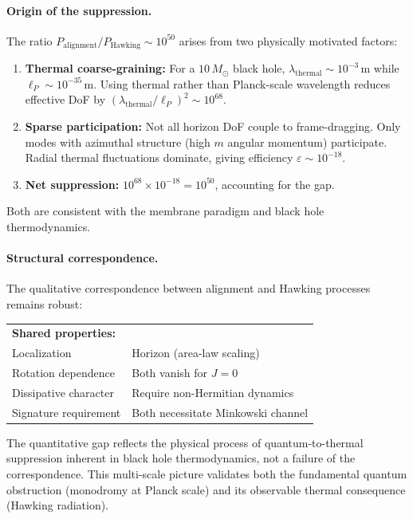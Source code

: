 \documentclass[11pt]{article}
\begin{document}
\paragraph{Origin of the suppression.}
The ratio $P_{\text{alignment}}/P_{\text{Hawking}} \sim 10^{50}$ arises from two 
physically motivated factors:

\begin{enumerate}[label=(\roman*)]
  \item \textbf{Thermal coarse-graining:} 
  For a $10\,M_\odot$ black hole, $\lambda_{\text{thermal}} \sim 10^{-3}\,\text{m}$ 
  while $\ell_P \sim 10^{-35}\,\text{m}$. Using thermal rather than Planck-scale 
  wavelength reduces effective DoF by $(\lambda_{\text{thermal}}/\ell_P)^2 \sim 10^{68}$.
  
  \item \textbf{Sparse participation:} 
  Not all horizon DoF couple to frame-dragging. Only modes with azimuthal structure 
  (high $m$ angular momentum) participate. Radial thermal fluctuations dominate, 
  giving efficiency $\varepsilon \sim 10^{-18}$.
  
  \item \textbf{Net suppression:} 
  $10^{68} \times 10^{-18} = 10^{50}$, accounting for the gap.
\end{enumerate}

Both are consistent with the membrane paradigm and black hole thermodynamics.

\paragraph{Structural correspondence.}
The qualitative correspondence between alignment and Hawking processes remains robust:

\begin{center}
\begin{tabular}{ll}
\textbf{Shared properties:} & \\
Localization & Horizon (area-law scaling) \\
Rotation dependence & Both vanish for $J=0$ \\
Dissipative character & Require non-Hermitian dynamics \\
Signature requirement & Both necessitate Minkowski channel \\
\end{tabular}
\end{center}

\noindent
The quantitative gap reflects the physical process of quantum-to-thermal 
suppression inherent in black hole thermodynamics, not a failure of the 
correspondence. This multi-scale picture validates both the fundamental 
quantum obstruction (monodromy at Planck scale) and its observable 
thermal consequence (Hawking radiation).
\end{document}

